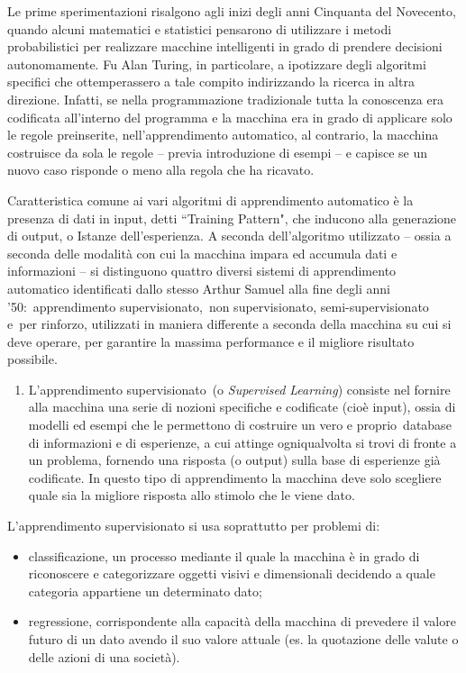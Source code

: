 \documentclass[
  b5paper,
  twoside,
  12pt,
  chapterprefix=false,
  bibliography=totocnumbered,
  parskip=false]{scrbook}
\providecommand{\tightlist}{%
  \setlength{\itemsep}{0pt}\setlength{\parskip}{0pt}}
\begin{document}
Le prime sperimentazioni risalgono agli inizi degli anni Cinquanta del
Novecento, quando alcuni matematici e statistici pensarono di utilizzare
i metodi probabilistici per realizzare macchine intelligenti in grado di
prendere decisioni autonomamente. Fu Alan Turing, in particolare, a
ipotizzare degli algoritmi specifici che ottemperassero a tale compito
indirizzando la ricerca in altra direzione. Infatti, se nella
programmazione tradizionale tutta la conoscenza era codificata
all'interno del programma e la macchina era in grado di applicare solo
le regole preinserite, nell'apprendimento automatico, al contrario, la
macchina costruisce da sola le regole -- previa introduzione di esempi
-- e capisce se un nuovo caso risponde o meno alla regola che ha
ricavato.

Caratteristica comune ai vari algoritmi di apprendimento automatico è la
presenza di dati in input, detti ``Training Pattern", che inducono alla
generazione di output, o Istanze dell'esperienza. A seconda
dell'algoritmo utilizzato -- ossia a seconda delle modalità con cui la
macchina impara ed accumula dati e informazioni -- si distinguono
quattro diversi sistemi di apprendimento automatico identificati dallo
stesso Arthur Samuel alla fine degli anni '50:~apprendimento
supervisionato,~non supervisionato, semi-supervisionato e~per rinforzo,
utilizzati in maniera differente a seconda della macchina su cui si deve
operare, per garantire la massima performance e il migliore risultato
possibile.

\begin{enumerate}
\def\labelenumi{\arabic{enumi}.}
\tightlist
\item
  L'apprendimento supervisionato~(o \emph{Supervised Learning}) consiste
  nel fornire alla macchina una serie di nozioni specifiche e
  codificate (cioè input), ossia di modelli ed esempi che le
  permettono di costruire un vero e proprio~database di informazioni e
  di esperienze, a cui attinge ogniqualvolta si trovi di fronte a un
  problema, fornendo una risposta (o output) sulla base di esperienze
  già codificate. In questo tipo di apprendimento la macchina deve
  solo scegliere quale sia la migliore risposta allo stimolo che le
  viene dato.
\end{enumerate}

L'apprendimento supervisionato si usa soprattutto per problemi di:

\begin{itemize}
\item
  classificazione, un processo mediante il quale la macchina è in
  grado di riconoscere e categorizzare oggetti visivi e dimensionali
  decidendo a quale categoria appartiene un determinato dato;
\item
  regressione, corrispondente alla capacità della macchina di
  prevedere il valore futuro di un dato avendo il suo valore attuale
  (es. la quotazione delle valute o delle azioni di una società).
\end{itemize}
\end{document}

